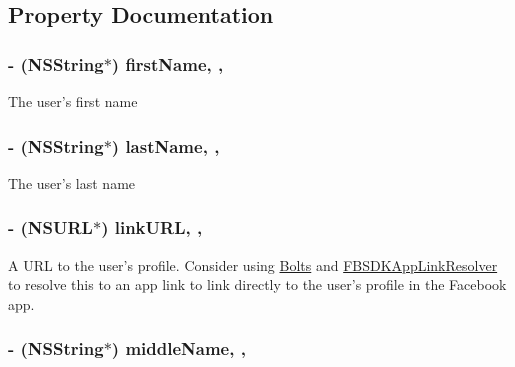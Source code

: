 \subsection{Property Documentation}
\hypertarget{interface_f_b_s_d_k_profile_a31272e40b64d9f34df275b6fcd79fc7b}{
\subsubsection[{first\-Name}]{\setlength{\rightskip}{0pt plus 5cm}-\/ (N\-S\-String$\ast$) first\-Name\hspace{0.3cm}{\ttfamily [read]}, {\ttfamily [nonatomic]}, {\ttfamily [assign]}}}\label{interface_f_b_s_d_k_profile_a31272e40b64d9f34df275b6fcd79fc7b}
The user's first name \hypertarget{interface_f_b_s_d_k_profile_ae6eb49fec06e9a53af370a18ab54e4a1}{
\subsubsection[{last\-Name}]{\setlength{\rightskip}{0pt plus 5cm}-\/ (N\-S\-String$\ast$) last\-Name\hspace{0.3cm}{\ttfamily [read]}, {\ttfamily [nonatomic]}, {\ttfamily [assign]}}}\label{interface_f_b_s_d_k_profile_ae6eb49fec06e9a53af370a18ab54e4a1}
The user's last name \hypertarget{interface_f_b_s_d_k_profile_ad18140af79f94f03a1317ff4cb1a5b31}{
\subsubsection[{link\-U\-R\-L}]{\setlength{\rightskip}{0pt plus 5cm}-\/ (N\-S\-U\-R\-L$\ast$) link\-U\-R\-L\hspace{0.3cm}{\ttfamily [read]}, {\ttfamily [nonatomic]}, {\ttfamily [assign]}}}\label{interface_f_b_s_d_k_profile_ad18140af79f94f03a1317ff4cb1a5b31}
A U\-R\-L to the user's profile.  Consider using \hyperlink{interface_bolts}{Bolts} and {\ttfamily \hyperlink{interface_f_b_s_d_k_app_link_resolver}{F\-B\-S\-D\-K\-App\-Link\-Resolver}} to resolve this to an app link to link directly to the user's profile in the Facebook app. \hypertarget{interface_f_b_s_d_k_profile_a27ffc05364ad2ebef222c9fb97a1369b}{
\subsubsection[{middle\-Name}]{\setlength{\rightskip}{0pt plus 5cm}-\/ (N\-S\-String$\ast$) middle\-Name\hspace{0.3cm}{\ttfamily [read]}, {\ttfamily [nonatomic]}, {\ttfamily [assign]}}}\label{interface_f_b_s_d_k_profile_a27ffc05364ad2ebef222c9fb97a1369b}
